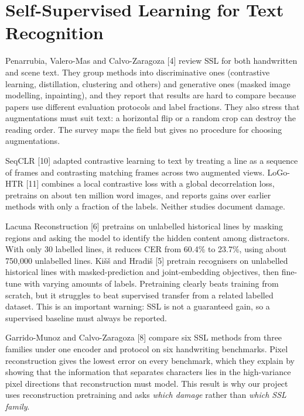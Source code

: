 \documentclass[
  12pt,
  a4paper,
]{report}
\begin{document}
\section{Self-Supervised Learning for Text
Recognition}\label{self-supervised-learning-for-text-recognition}

Penarrubia, Valero-Mas and Calvo-Zaragoza {[}4{]} review SSL for both
handwritten and scene text. They group methods into discriminative ones
(contrastive learning, distillation, clustering and others) and
generative ones (masked image modelling, inpainting), and they report
that results are hard to compare because papers use different evaluation
protocols and label fractions. They also stress that augmentations must
suit text: a horizontal flip or a random crop can destroy the reading
order. The survey maps the field but gives no procedure for choosing
augmentations.

SeqCLR {[}10{]} adapted contrastive learning to text by treating a line
as a sequence of frames and contrasting matching frames across two
augmented views. LoGo-HTR {[}11{]} combines a local contrastive loss
with a global decorrelation loss, pretrains on about ten million word
images, and reports gains over earlier methods with only a fraction of
the labels. Neither studies document damage.

Lacuna Reconstruction {[}6{]} pretrains on unlabelled historical lines
by masking regions and asking the model to identify the hidden content
among distractors. With only 30 labelled lines, it reduces CER from
60.4\% to 23.7\%, using about 750,000 unlabelled lines. Kišš and Hradiš
{[}5{]} pretrain recognisers on unlabelled historical lines with
masked-prediction and joint-embedding objectives, then fine-tune with
varying amounts of labels. Pretraining clearly beats training from
scratch, but it struggles to beat supervised transfer from a related
labelled dataset. This is an important warning: SSL is not a guaranteed
gain, so a supervised baseline must always be reported.

Garrido-Munoz and Calvo-Zaragoza {[}8{]} compare six SSL methods from
three families under one encoder and protocol on six handwriting
benchmarks. Pixel reconstruction gives the lowest error on every
benchmark, which they explain by showing that the information that
separates characters lies in the high-variance pixel directions that
reconstruction must model. This result is why our project uses
reconstruction pretraining and asks \emph{which damage} rather than
\emph{which SSL family}.
\end{document}
